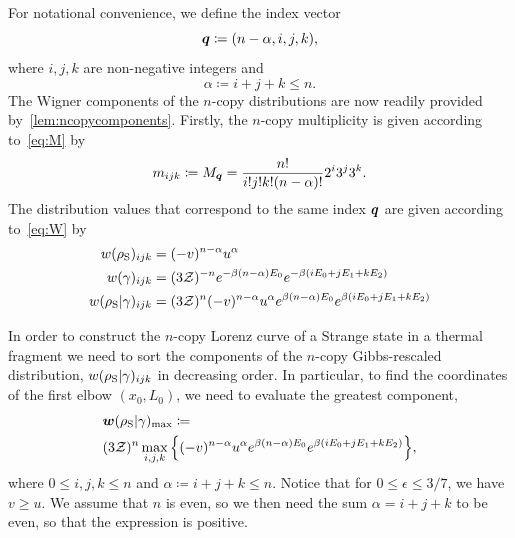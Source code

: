 \documentclass[pra,
aps,
twocolumn,
superscriptaddress,
groupedaddress,
nofootinbib,
reprint
]{revtex4-1}
\begin{document}
For notational convenience, we define the index vector
\begin{equation}
	\bm{q} \coloneqq (n-\alpha,i,j,k),
\end{equation}
where $i,j,k$ are non-negative integers and
\begin{equation*}
	\alpha \coloneqq i+j+k \leq n.
\end{equation*}
The Wigner components of the $n$-copy distributions are now readily provided by~\cref{lem:ncopycomponents}.
Firstly, the $n$-copy multiplicity is given according to~\cref{eq:M} by
\begin{equation}
	m_{ijk} \coloneqq M_{\bm{q}} = \frac{n!}{i!j!k!(n-\alpha)!} 2^i 3^j 3^k.
\end{equation}
The distribution values that correspond to the same index $\bm{q}$ are given according to~\cref{eq:W} by
\begin{align}
	w(\rho_{\rm{S}})_{ijk} &= (-v)^{n-\alpha} u^{\alpha} \\
	w(\gamma)_{ijk} &= (3\mathcal{Z})^{-n} e^{-\beta (n-\alpha)E_0} e^{-\beta ( i E_0 + j E_1 + k E_2 )} \\
	w(\rho_{\rm{S}} | \gamma)_{ijk} &= (3\mathcal{Z})^{n} (-v)^{n-\alpha} u^{\alpha} e^{\beta (n-\alpha)E_0} e^{\beta ( i E_0 + j E_1 + k E_2 )}
\end{align}

In order to construct the $n$-copy Lorenz curve of a Strange state in a thermal fragment we need to sort the components of the $n$-copy Gibbs-rescaled distribution, $w(\rho_{\rm{S}} | \gamma)_{ijk}$ in decreasing order.
In particular, to find the coordinates of the first elbow $(x_0, L_0)$, we need to evaluate the greatest component,
\begin{align}
	&\bm{w}(\rho_{\rm{S}} | \gamma)_{\rm{max}} \coloneqq \label{eq:max_slope}\\
	&(3\mathcal{Z})^{n} \max\limits_{i,j,k}\Big\{ (-v)^{n-\alpha} u^{\alpha} e^{\beta (n-\alpha)E_0} e^{\beta ( i E_0 + j E_1 + k E_2 )} \Big\}, \nonumber
\end{align}
where $0 \leq i,j,k \leq n$ and $\alpha \coloneqq i+j+k \leq n$.
Notice that for $0 \leq \epsilon \leq 3/7$, we have $v \geq u$. 
We assume that $n$ is even, so we then need the sum $\alpha = i+j+k$ to be even, so that the expression is positive.
\end{document}
